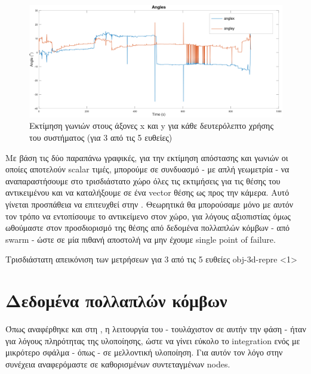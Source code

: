 \begin{figure}[H]
  \centering
  \includegraphics[width=\linewidth]{../Images/Experiments-Results/raspberry-exp-angles.png}
  \decoRule
  \caption[Εκτίμηση γωνιών στους άξονες x και y για κάθε δευτερόλεπτο χρήσης του συστήματος]{Εκτίμηση γωνιών στους άξονες x και y για κάθε δευτερόλεπτο χρήσης του συστήματος (για 3 από τις 5 ευθείες)}
  \label{fig:angles-usage-experiment-example}
\end{figure}

Με βάση τις δύο παραπάνω γραφικές, για την εκτίμηση απόστασης και γωνιών οι οποίες αποτελούν scalar τιμές, μπορούμε σε συνδυασμό - με απλή γεωμετρία - να αναπαραστήσουμε στο τρισδιάστατο χώρο όλες τις εκτιμήσεις για τις θέσης του αντικειμένου και να καταλήξουμε σε ένα vector θέσης ως προς την κάμερα. Αυτό γίνεται προσπάθεια να επιτευχθεί στην . Θεωρητικά θα μπορούσαμε μόνο με αυτόν τον τρόπο να εντοπίσουμε το αντικείμενο στον  χώρο, για λόγους α\-ξιο\-πι\-στίας όμως ωθούμαστε στον προσδιορισμό της θέσης από δεδομένα πολλαπλών κόμβων - από swarm - ώστε σε μία πιθανή αποστολή να μην έχουμε single point of failure. 

{Τρισδιάστατη απεικόνιση των μετρήσεων για 3 από τις 5 ευθείες}%
{obj-3d-repre}%
<1>


\section{Δεδομένα πολλαπλών κόμβων}
Όπως αναφέρθηκε και στη , η λειτουργία του  - τουλάχιστον σε αυτήν την φάση - ήταν για λόγους πληρότητας της υλοποίησης, ώστε να γίνει εύκολο το integration ενός  με μικρότερο σφάλμα - όπως   - σε μελλοντική υλοποίηση. Για αυτόν τον λόγο στην συνέχεια αναφερόμαστε σε καθορισμένων συντεταγμένων nodes.

